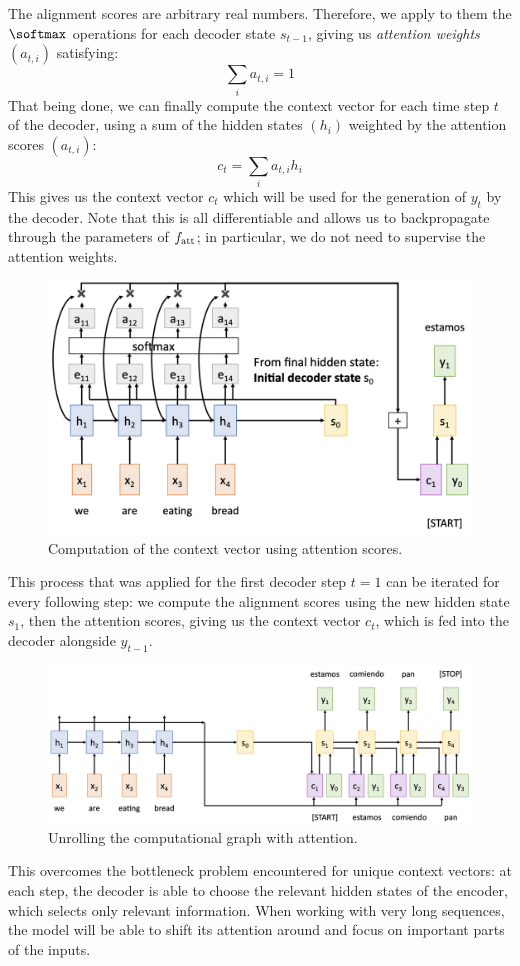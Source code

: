 The alignment scores are arbitrary real numbers. Therefore, we apply to them the $\softmax$ operations for each decoder state $s_{t-1}$, giving us \emph{attention weights} $(a_{t,i})$ satisfying:
\begin{equation*}
    \sum_i a_{t,i} = 1 
\end{equation*}
That being done, we can finally compute the context vector for each time step $t$ of the decoder, using a sum of the hidden states $(h_i)$ weighted by the attention scores $(a_{t,i})$:
\begin{equation*}
    c_t = \sum_i a_{t,i} h_i
\end{equation*}
This gives us the context vector $c_t$ which will be used for the generation of $y_t$ by the decoder. Note that this is all differentiable and allows us to backpropagate through the parameters of $f_{\textnormal{att}}$; in particular, we do not need to supervise the attention weights.
\begin{figure}[H]
    \centering
    \includegraphics[width=.65\textwidth]{images/attention-context.png}
    \caption{Computation of the context vector using attention scores.}
\end{figure}
This process that was applied for the first decoder step $t=1$ can be iterated for every following step: we compute the alignment scores using the new hidden state $s_1$, then the attention scores, giving us the context vector $c_t$, which is fed into the decoder alongside $y_{t-1}$.
\begin{figure}[H]
    \centering
    \includegraphics[width=.9\textwidth]{images/attention-unrolled.png}
    \caption{Unrolling the computational graph with attention.}
\end{figure}
This overcomes the bottleneck problem encountered for unique context vectors: at each step, the decoder is able to choose the relevant hidden states of the encoder, which selects only relevant information. When working with very long sequences, the model will be able to shift its attention around and focus on important parts of the inputs.

